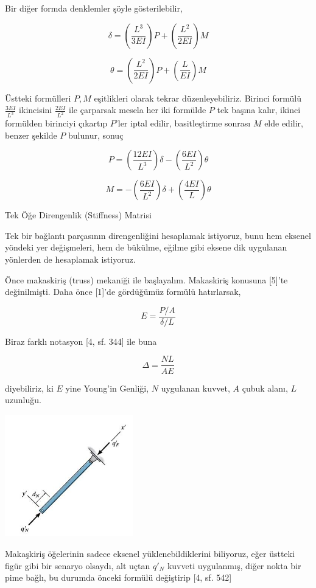\documentclass[12pt,fleqn]{article}\usepackage{../../common}
\begin{document}
Bir diğer formda denklemler şöyle gösterilebilir,

$$
\delta = \left( \frac{L^3}{3EI} \right) P +
\left( \frac{L^2}{2EI} \right) M
$$

$$
\theta = \left( \frac{L^2}{2EI} \right) P +
\left( \frac{L}{EI} \right) M
$$

Üstteki formülleri $P,M$ eşitlikleri olarak tekrar düzenleyebiliriz.
Birinci formülü $\frac{3EI}{L^3}$ ikincisini $\frac{2EI}{L^2}$ ile
çarparsak mesela her iki formülde $P$ tek başına kalır, ikinci formülden
birinciyi çıkartıp $P$'ler iptal edilir, basitleştirme sonrası $M$ elde
edilir, benzer şekilde $P$ bulunur, sonuç

$$
P = \left( \frac{12EI}{L^3}  \right) \delta -
\left(  \frac{6EI}{L^2} \right) \theta
$$

$$
M = - \left( \frac{6 EI}{L^2}  \right) \delta +
\left( \frac{4 EI}{L}  \right) \theta
$$

Tek Öğe Direngenlik (Stiffness) Matrisi

Tek bir bağlantı parçasının direngenliğini hesaplamak istiyoruz, bunu hem
eksenel yöndeki yer değişmeleri, hem de bükülme, eğilme gibi eksene dik
uygulanan yönlerden de hesaplamak istiyoruz.

Önce makaskiriş (truss) mekaniği ile başlayalım. Makaskiriş konusuna [5]'te
değinilmişti. Daha önce [1]'de gördüğümüz formülü hatırlarsak,

$$
E = \frac{P/A}{\delta / L}
$$

Biraz farklı notasyon [4, sf. 344] ile buna

$$
\Delta = \frac{NL}{AE}
$$

diyebiliriz, ki $E$ yine Young'in Genliği, $N$ uygulanan kuvvet, $A$ çubuk
alanı, $L$ uzunluğu.

\includegraphics[width=15em]{phy_020_strs_05_06.jpg}

Makaşkiriş öğelerinin sadece eksenel yüklenebildiklerini biliyoruz, eğer üstteki
figür gibi bir senaryo olsaydı, alt uçtan $q'_N$ kuvveti uygulanmış, diğer nokta
bir pime bağlı, bu durumda önceki formülü değiştirip [4, sf. 542]
\end{document}
